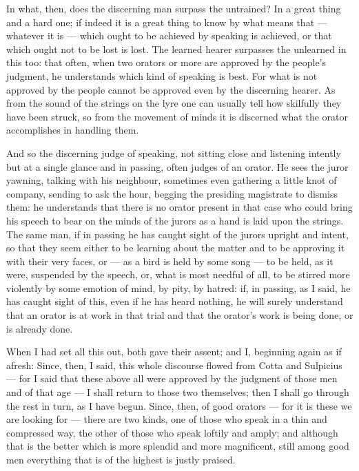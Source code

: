  In what, then, does the discerning man surpass the untrained? In a great thing and a hard one; if indeed it is a great thing to know by what means that — whatever it is — which ought to be achieved by speaking is achieved, or that which ought not to be lost is lost. The learned hearer surpasses the unlearned in this too: that often, when two orators or more are approved by the people's judgment, he understands which kind of speaking is best. For what is not approved by the people cannot be approved even by the discerning hearer. As from the sound of the strings on the lyre one can usually tell how skilfully they have been struck, so from the movement of minds it is discerned what the orator accomplishes in handling them.

 And so the discerning judge of speaking, not sitting close and listening intently but at a single glance and in passing, often judges of an orator. He sees the juror yawning, talking with his neighbour, sometimes even gathering a little knot of company, sending to ask the hour, begging the presiding magistrate to dismiss them: he understands that there is no orator present in that case who could bring his speech to bear on the minds of the jurors as a hand is laid upon the strings. The same man, if in passing he has caught sight of the jurors upright and intent, so that they seem either to be learning about the matter and to be approving it with their very faces, or — as a bird is held by some song — to be held, as it were, suspended by the speech, or, what is most needful of all, to be stirred more violently by some emotion of mind, by pity, by hatred: if, in passing, as I said, he has caught sight of this, even if he has heard nothing, he will surely understand that an orator is at work in that trial and that the orator's work is being done, or is already done.

 When I had set all this out, both gave their assent; and I, beginning again as if afresh: Since, then, I said, this whole discourse flowed from Cotta and Sulpicius — for I said that these above all were approved by the judgment of those men and of that age — I shall return to those two themselves; then I shall go through the rest in turn, as I have begun. Since, then, of good orators — for it is these we are looking for — there are two kinds, one of those who speak in a thin and compressed way, the other of those who speak loftily and amply; and although that is the better which is more splendid and more magnificent, still among good men everything that is of the highest is justly praised.

